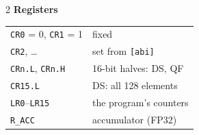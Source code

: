 \documentclass[11pt,a4paper]{article}
\begin{document}
\begin{tcolorbox}[enhanced, colback=white, colframe=muted, boxrule=0.8pt, arc=4pt,
  left=10pt, right=10pt, top=8pt, bottom=6pt]
{\begin{multicols}{2}
\medskip\textbf{\sffamily Registers}\par
\begin{tabular}{@{}ll@{}}
\texttt{CR0} = 0, \texttt{CR1} = 1 & fixed \\
\texttt{CR2}, \ldots & set from \texttt{[abi]} \\
\texttt{CRn.L}, \texttt{CRn.H} & 16-bit halves: DS, QF \\
\texttt{CR15.L} & DS: all 128 elements \\
\texttt{LR0}--\texttt{LR15} & the program's counters \\
\texttt{R\_ACC} & accumulator (FP32) \\
\end{tabular}
\end{multicols}
}
\end{tcolorbox}
\end{document}

